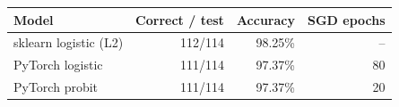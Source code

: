 \begin{tabular}{lrrr}
\toprule
Model & Correct / test & Accuracy & SGD epochs \\
\midrule
sklearn logistic (L2) & 112/114 & 98.25\% & -- \\
PyTorch logistic & 111/114 & 97.37\% & 80 \\
PyTorch probit & 111/114 & 97.37\% & 20 \\
\bottomrule
\end{tabular}
